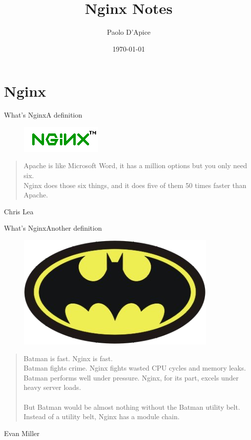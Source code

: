 \documentclass{beamer}
\title{Nginx Notes}
\author{Paolo D'Apice}
\institute{iZENEsoft (Shanghai) Co. Ltd.}
\date{\today}
\begin{document}
\begin{frame}
 \maketitle
\end{frame}

\section{Nginx}

\begin{frame}{What's Nginx}{A definition}
\begin{figure}
\includegraphics[scale=.4]{nginx.png}
\end{figure}
\begin{quote} \small
Apache is like Microsoft Word, it has a million options but you only need six. \\
Nginx does those six things, and it does five of them 50 times faster than Apache.
\end{quote}
\begin{flushright}
Chris Lea 
\end{flushright}
\end{frame}

\begin{frame}{What's Nginx}{Another definition}
\begin{figure}
\includegraphics[scale=.125]{batman.png}
\end{figure}
\begin{quote} \small
Batman is fast. Nginx is fast.\\
Batman fights crime. Nginx fights wasted CPU cycles and memory leaks.\\
Batman performs well under pressure. Nginx, for its part, excels under heavy server loads.\\
\ \\
But Batman would be almost nothing without the Batman utility belt.
Instead of a utility belt, Nginx has a module chain.
\end{quote}
\begin{flushright}
Evan Miller 
\end{flushright}
\end{frame}
\end{document}
